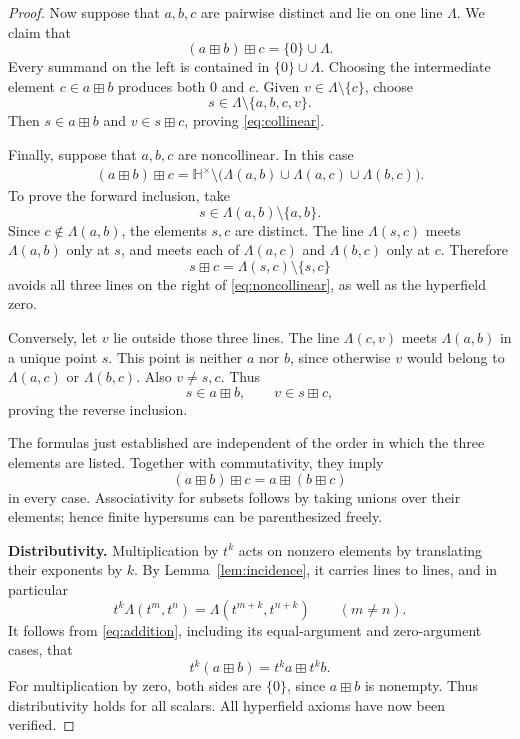 \documentclass[11pt]{article}
\newcommand{\HH}{\mathbb{H}}
\begin{document}
\begin{proof}
Now suppose that \(a,b,c\) are pairwise distinct and lie on one line
\(\Lambda\). We claim that
\begin{equation}\label{eq:collinear}
    (a\boxplus b)\boxplus c=\{0\}\cup\Lambda.
\end{equation}
Every summand on the left is contained in \(\{0\}\cup\Lambda\).
Choosing the intermediate element \(c\in a\boxplus b\) produces both
\(0\) and \(c\). Given \(v\in\Lambda\setminus\{c\}\), choose
\[
    s\in\Lambda\setminus\{a,b,c,v\}.
\]
Then \(s\in a\boxplus b\) and \(v\in s\boxplus c\), proving
\eqref{eq:collinear}.

Finally, suppose that \(a,b,c\) are noncollinear. In this case
\begin{equation}\label{eq:noncollinear}
\begin{split}
    (a\boxplus b)\boxplus c
    =\HH^\times\setminus
    \bigl(
       \Lambda(a,b)\cup\Lambda(a,c)\cup\Lambda(b,c)
    \bigr).
\end{split}
\end{equation}
To prove the forward inclusion, take
\[
    s\in\Lambda(a,b)\setminus\{a,b\}.
\]
Since \(c\notin\Lambda(a,b)\), the elements \(s,c\) are distinct.
The line \(\Lambda(s,c)\) meets \(\Lambda(a,b)\) only at \(s\), and
meets each of \(\Lambda(a,c)\) and \(\Lambda(b,c)\) only at \(c\).
Therefore
\[
    s\boxplus c=\Lambda(s,c)\setminus\{s,c\}
\]
avoids all three lines on the right of \eqref{eq:noncollinear}, as well
as the hyperfield zero.

Conversely, let \(v\) lie outside those three lines.
The line \(\Lambda(c,v)\) meets \(\Lambda(a,b)\) in a unique point \(s\).
This point is neither \(a\) nor \(b\), since otherwise \(v\) would belong
to \(\Lambda(a,c)\) or \(\Lambda(b,c)\). Also \(v\neq s,c\).
Thus
\[
    s\in a\boxplus b,\qquad v\in s\boxplus c,
\]
proving the reverse inclusion.

The formulas just established are independent of the order in which the
three elements are listed. Together with commutativity, they imply
\[
    (a\boxplus b)\boxplus c=a\boxplus(b\boxplus c)
\]
in every case. Associativity for subsets follows by taking unions over
their elements; hence finite hypersums can be parenthesized freely.

\medskip
\noindent
\textbf{Distributivity.}
Multiplication by \(t^k\) acts on nonzero elements by translating their
exponents by \(k\). By Lemma~\ref{lem:incidence}, it carries lines to
lines, and in particular
\[
    t^k\Lambda(t^m,t^n)
    =\Lambda(t^{m+k},t^{n+k})
    \qquad(m\neq n).
\]
It follows from \eqref{eq:addition}, including its equal-argument and
zero-argument cases, that
\[
    t^k(a\boxplus b)=t^ka\boxplus t^kb.
\]
For multiplication by zero, both sides are \(\{0\}\), since
\(a\boxplus b\) is nonempty. Thus distributivity holds for all scalars.
All hyperfield axioms have now been verified.
\end{proof}
\end{document}
